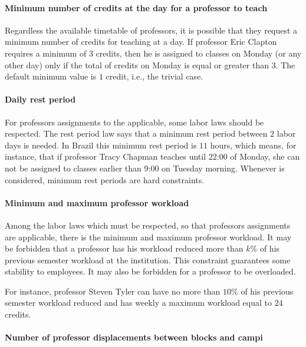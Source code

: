 \paragraph{Minimum number of credits at the day for a professor to teach}
\label{constrmincredsdayprof}

Regardless the available timetable of professors, it is possible that they request a minimum number of credits for teaching at a day. If professor Eric Clapton requires a minimum of $3$ credits, then he is assigned to classes on Monday (or any other day) only if the total of credits on Monday is equal or greater than $3$. The default minimum value is $1$ credit, i.e., the trivial case.


\paragraph{Daily rest period}
\label{constrrestperiod}

For professors assignments to the applicable, some labor laws should be respected. The rest period law says that a minimum rest period between $2$ labor days is needed. In Brazil this minimum rest period is $11$ hours, which means, for instance, that if professor Tracy Chapman teaches until 22:00 of Monday, she can not be assigned to classes earlier than 9:00 on Tuesday morning. Whenever is considered, minimum rest periods are hard constraints.


\paragraph{Minimum and maximum professor workload}
\label{constrminmaxworkload}

Among the labor laws which must be respected, so that professors assignments are applicable, there is the minimum and maximum professor workload. It may be forbidden that a professor has his workload reduced more than $k\%$ of his previous semester workload at the institution. This constraint guarantees some stability to employees. It may also be forbidden for a professor to be overloaded.

For instance, professor Steven Tyler can have no more than $10\%$ of his previous semester workload reduced and has weekly a maximum workload equal to $24$ credits.


\paragraph{Number of professor displacements between blocks and campi}
\label{constrprofdisplacnum}

